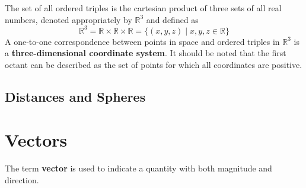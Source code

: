 \documentclass[../Calculus_\Roman{3}]{subfiles}
\begin{document}
			The set of all ordered triples is the cartesian product of three sets of all real numbers, denoted appropriately by $\mathbb{R}^3$ and defined as
			\[\mathbb{R}^3 = \mathbb{R} \times \mathbb{R} \times \mathbb{R} = \{(x, y, z) \mid x, y, z \in \mathbb{R}\}\]
			A one-to-one correspondence between points in space and ordered triples in $\mathbb{R}^3$ is a \textbf{three-dimensional coordinate system}. It should be noted that the first octant can be described as the set of points for which all coordinates are positive.
			\subsection*{Distances and Spheres}
		\section{Vectors}
			The term \textbf{vector} is used to indicate a quantity with both magnitude and direction.
\end{document}
